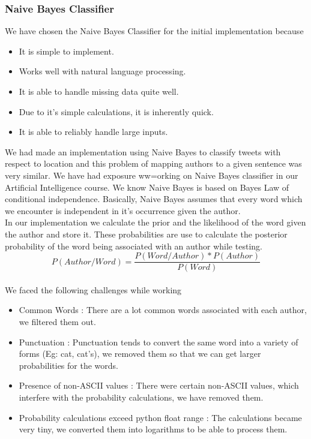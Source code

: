 \documentclass[fleqn,10pt]{SelfArx} %
\begin{document}
\subsubsection{Naive Bayes Classifier}
We have chosen the Naive Bayes Classifier for the initial implementation because
\begin{itemize}[noitemsep]
	\item It is simple to implement.
	\item Works well with natural language processing.
	\item It is able to handle missing data quite well.
	\item Due to it's simple calculations, it is inherently quick.
	\item It is able to reliably handle large inputs.
\end{itemize}
We had made an implementation using Naive Bayes to classify tweets with respect to location and this problem of mapping authors to a given sentence was very similar.
We have had exposure ww=orking on Naive Bayes classifier in our Artificial Intelligence course. We know Naive Bayes is based on Bayes Law of conditional independence. Basically, Naive Bayes assumes that every word which we encounter is independent in it's occurrence given the author.\\
In our implementation we calculate the prior and the likelihood of the word given the author and store it. These probabilities are use to calculate the posterior probability of the word being associated with an author while testing.\\
\begin{equation}
P(Author/Word) =\frac{P(Word/Author)*P(Author)}{P(Word)}
\label{eq:refname3}
\end{equation}
\\
We faced the following challenges while working
\begin{itemize}[noitemsep]
	\item Common Words : There are a lot common words associated with each author, we filtered them out.
	\item Punctuation : Punctuation tends to convert the same word into a variety of forms (Eg: cat, cat's), we removed them so that we can get larger probabilities for the words.
	\item Presence of non-ASCII values : There were certain non-ASCII values, which interfere with the probability calculations, we have removed them.
	\item Probability calculations exceed python float range : The calculations became very tiny, we converted them into logarithms to be able to process them.
\end{itemize}
\end{document}
